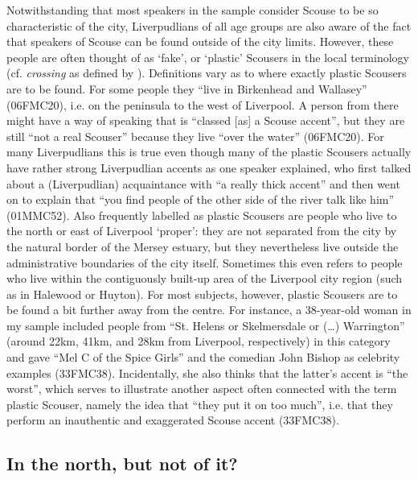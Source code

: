 Notwithstanding that most speakers in the sample consider Scouse to be so characteristic of the city, Liverpudlians of all age groups are also aware of the fact that speakers of Scouse can be found outside of the city limits.
However, these people are often thought of as `fake', or `plastic' Scousers in the local terminology (cf. \emph{crossing} as defined by \citealt{rampton1995}).
Definitions vary as to where exactly plastic Scousers are to be found.
For some people they ``live in Birkenhead and Wallasey'' (06FMC20), i.e. on the  peninsula to the west of Liverpool.
A person from there might have a way of speaking that is ``classed [as] a Scouse accent'', but they are still ``not a real Scouser'' because they live ``over the water'' (06FMC20).
For many Liverpudlians this is true even though many of the plastic Scousers actually have rather strong Liverpudlian accents as one speaker explained, who first talked about a (Liverpudlian) acquaintance with ``a really thick accent'' and then went on to explain that ``you find people of the other side of the river talk like him'' (01MMC52).
Also frequently labelled as plastic Scousers are people who live to the north or east of Liverpool `proper': they are not separated from the city by the natural border of the Mersey estuary, but they nevertheless live outside the administrative boundaries of the city itself.
Sometimes this even refers to people who live within the contiguously built-up area of the Liverpool city region (such as in Halewood or Huyton).
For most subjects, however, plastic Scousers are to be found a bit further away from the centre.
For instance, a 38-year-old woman in my sample included people from ``St. Helens or Skelmersdale or (\ldots) Warrington'' (around 22km, 41km, and 28km from Liverpool, respectively) in this category and gave ``Mel C of the Spice Girls'' and the comedian John Bishop as celebrity examples (33FMC38).
Incidentally, she also thinks that the latter's accent is ``the worst'', which serves to illustrate another aspect often connected with the term plastic Scouser, namely the idea that ``they put it on too much'', i.e. that they perform an inauthentic and exaggerated Scouse accent (33FMC38).

\subsection{In the north, but not of it?}
\label{aware_res.north}


